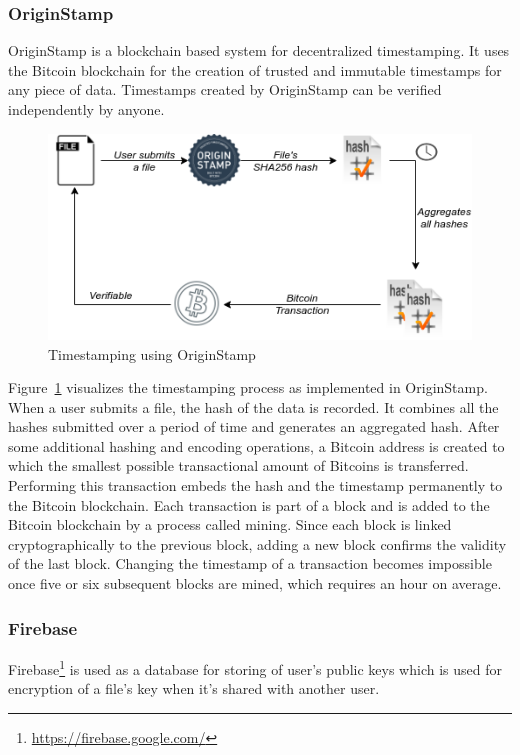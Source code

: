			\subsubsection{OriginStamp}
			OriginStamp\cite{hepp2018originstamp} is a blockchain based system for decentralized timestamping. It uses the Bitcoin blockchain for the creation of trusted and immutable timestamps for any piece of data. Timestamps created by OriginStamp can be verified independently by anyone.
			
			\begin{figure}[h]
				\includegraphics[width=\linewidth]{figures/origin-stamp}
				\caption{\label{fig:originstamp} Timestamping using OriginStamp}
			\end{figure}
			
			Figure~\ref{fig:originstamp} visualizes the timestamping process as implemented in OriginStamp. When a user submits a file, the hash of the data is recorded. It combines all the hashes submitted over a period of time and generates an aggregated hash. After some additional hashing and encoding operations, a Bitcoin address is created to which the smallest possible transactional amount of Bitcoins is transferred. Performing this transaction embeds the hash and the timestamp permanently to the Bitcoin blockchain. Each transaction is part of a block and is added to the Bitcoin blockchain by a process called mining. Since each block is linked cryptographically to the previous block, adding a new block confirms the validity of the last block. Changing the timestamp of a transaction becomes impossible once five or six subsequent blocks are mined, which requires an hour on average\cite{nakamoto2008bitcoin}.
			
			\subsubsection{Firebase}
			Firebase\footnote{\url{https://firebase.google.com/}} is used as a database for storing of user's public keys which is used for encryption of a file's key when it's shared with another user.
			
